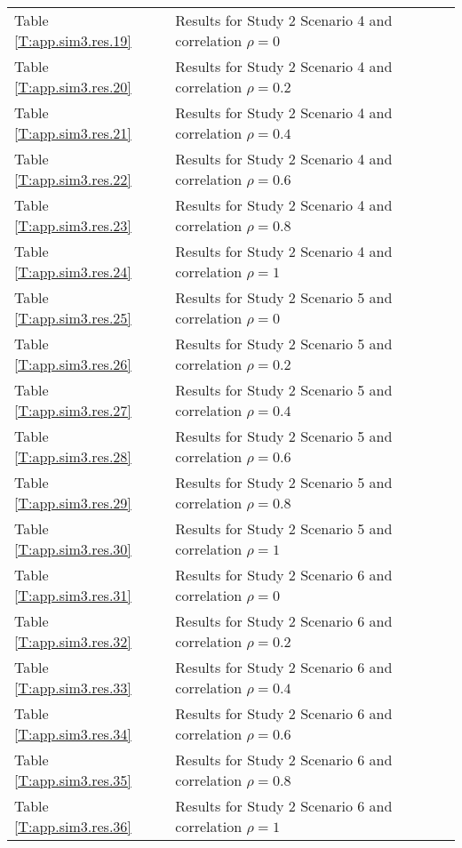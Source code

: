 \begin{tabular}{ll}
   \hline
Table \ref{T:app.sim3.res.19} & Results for Study 2 Scenario 4 and correlation $\rho =0$ \\ 
  Table \ref{T:app.sim3.res.20} & Results for Study 2 Scenario 4 and correlation $\rho =0.2$ \\ 
  Table \ref{T:app.sim3.res.21} & Results for Study 2 Scenario 4 and correlation $\rho =0.4$ \\ 
  Table \ref{T:app.sim3.res.22} & Results for Study 2 Scenario 4 and correlation $\rho =0.6$ \\ 
  Table \ref{T:app.sim3.res.23} & Results for Study 2 Scenario 4 and correlation $\rho =0.8$ \\ 
  Table \ref{T:app.sim3.res.24} & Results for Study 2 Scenario 4 and correlation $\rho =1$ \\ 
   \hline
Table \ref{T:app.sim3.res.25} & Results for Study 2 Scenario 5 and correlation $\rho =0$ \\ 
  Table \ref{T:app.sim3.res.26} & Results for Study 2 Scenario 5 and correlation $\rho =0.2$ \\ 
  Table \ref{T:app.sim3.res.27} & Results for Study 2 Scenario 5 and correlation $\rho =0.4$ \\ 
  Table \ref{T:app.sim3.res.28} & Results for Study 2 Scenario 5 and correlation $\rho =0.6$ \\ 
  Table \ref{T:app.sim3.res.29} & Results for Study 2 Scenario 5 and correlation $\rho =0.8$ \\ 
  Table \ref{T:app.sim3.res.30} & Results for Study 2 Scenario 5 and correlation $\rho =1$ \\ 
   \hline
Table \ref{T:app.sim3.res.31} & Results for Study 2 Scenario 6 and correlation $\rho =0$ \\ 
  Table \ref{T:app.sim3.res.32} & Results for Study 2 Scenario 6 and correlation $\rho =0.2$ \\ 
  Table \ref{T:app.sim3.res.33} & Results for Study 2 Scenario 6 and correlation $\rho =0.4$ \\ 
  Table \ref{T:app.sim3.res.34} & Results for Study 2 Scenario 6 and correlation $\rho =0.6$ \\ 
  Table \ref{T:app.sim3.res.35} & Results for Study 2 Scenario 6 and correlation $\rho =0.8$ \\ 
  Table \ref{T:app.sim3.res.36} & Results for Study 2 Scenario 6 and correlation $\rho =1$ \\ 
   \hline
\end{tabular}

